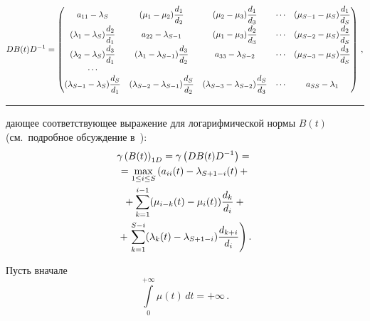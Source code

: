 { %
\begin{equation*}
DB(t)D^{-1}= %
\begin{pmatrix}
a_{11}-\la_S    &  (\mu_1-\mu_2) \fr{d_1}{d_2}
 & (\mu_2-\mu_3)\fr{d_1}{d_3}
 & \cdots &  (\mu_{S-1}-\mu_S)\fr{d_1}{d_S} \\
(\la_1-\la_S) \fr{d_2}{d_1}     &  a_{22}-\la_{S-1}
 &(\mu_1-\mu_3)\fr{d_2}{d_3}
 & \cdots &  (\mu_{S-2}-\mu_S)\fr{d_2}{d_S} \\
(\la_2-\la_S) \fr{d_3}{d_1}     &  (\la_1-\la_{S-1})\fr{d_3}{d_2}
 &a_{33}-\la_{S-2}
& \cdots &  (\mu_{S-3}-\mu_S)\fr{d_3}{d_S}  \\
\cdots \\
(\la_{S-1} -\la_S) \fr{d_S}{d_1} & (\la_{S-2} -\la_{S-1}) \fr{d_S}{d_2}
& (\la_{S-3} -\la_{S-2}) \fr{d_S}{d_3}
    & \cdots & a_{SS}-\la_1 \\
\end{pmatrix}\,,
\end{equation*}

\hrule

\begin{multicols}{2}

\noindent
дающее соответствующее выражение для логарифмической нормы $B(t)$
(см.\ подробное обсуждение в~\cite{gz04,z95,z06}):
\begin{multline}
\gamma \left(B(t)\right)_{1D} = \gamma \left(DB(t)D^{-1}\right) = {} \\
{}=\max\limits_{1 \le i \le S} \left(a_{ii}(t) -\lambda_{S+1-i}(t) +{}\right.\\
\left.{}+
\sum\limits_{k=1}^{i-1}(\mu_{i-k}(t)-\mu_i(t))\displaystyle\frac{\displaystyle d_k\mathstrut}{\displaystyle d_i\mathstrut} +{} \right. \\
{}+\left.\sum\limits_{k=1}^{S-i}(\lambda_k (t)-\lambda_{S+1-i})\displaystyle\frac{\displaystyle d_{k+i}\mathstrut}{\displaystyle d_i\mathstrut}\right).
\label{031}
\end{multline}

\medskip

Пусть вначале
\begin{equation}
\label{030}
\int\limits_0^{+\infty} \mu(t)\,dt = +\infty\,.
\end{equation}


\end{multicols}}
